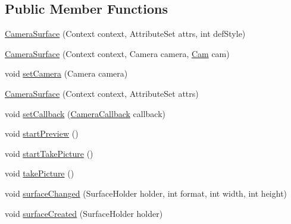 \subsection*{Public Member Functions}
\begin{DoxyCompactItemize}
\item 
\hyperlink{classswp_1_1tuilmenau_1_1carduinodroid_1_1controller_1_1_camera_surface_a1c578c6418952fd170916dad67e26152}{Camera\+Surface} (Context context, Attribute\+Set attrs, int def\+Style)
\item 
\hyperlink{classswp_1_1tuilmenau_1_1carduinodroid_1_1controller_1_1_camera_surface_a51856c105777cea804768ed2be7f7aa4}{Camera\+Surface} (Context context, Camera camera, \hyperlink{classswp_1_1tuilmenau_1_1carduinodroid_1_1controller_1_1_cam}{Cam} cam)
\item 
void \hyperlink{classswp_1_1tuilmenau_1_1carduinodroid_1_1controller_1_1_camera_surface_ac0aa798901364be1828f205d940caf4d}{set\+Camera} (Camera camera)
\item 
\hyperlink{classswp_1_1tuilmenau_1_1carduinodroid_1_1controller_1_1_camera_surface_a194d84cc79b5b31f67e620d781438ed3}{Camera\+Surface} (Context context, Attribute\+Set attrs)
\item 
void \hyperlink{classswp_1_1tuilmenau_1_1carduinodroid_1_1controller_1_1_camera_surface_ae9a5ce16713f1cfdb31de1fd212b25e5}{set\+Callback} (\hyperlink{interfaceswp_1_1tuilmenau_1_1carduinodroid_1_1controller_1_1_camera_callback}{Camera\+Callback} callback)
\item 
void \hyperlink{classswp_1_1tuilmenau_1_1carduinodroid_1_1controller_1_1_camera_surface_af09140f0c6c04a3ab83867c9abbd4276}{start\+Preview} ()
\item 
void \hyperlink{classswp_1_1tuilmenau_1_1carduinodroid_1_1controller_1_1_camera_surface_a05163b152120d5aafe3f5d3636d067b3}{start\+Take\+Picture} ()
\item 
void \hyperlink{classswp_1_1tuilmenau_1_1carduinodroid_1_1controller_1_1_camera_surface_a1060767f277e105ef471cc9e299d94bf}{take\+Picture} ()
\item 
void \hyperlink{classswp_1_1tuilmenau_1_1carduinodroid_1_1controller_1_1_camera_surface_a13e24d8a91a594a27cd66f52725de994}{surface\+Changed} (Surface\+Holder holder, int format, int width, int height)
\item 
void \hyperlink{classswp_1_1tuilmenau_1_1carduinodroid_1_1controller_1_1_camera_surface_a714c66493b927383d94a844b742181b8}{surface\+Created} (Surface\+Holder holder)
\item 

\end{DoxyCompactItemize}
